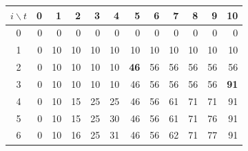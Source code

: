 \begin{tabular}{c|rrrrrrrrrrr}
\toprule
$i \backslash t$ & 0 & 1 & 2 & 3 & 4 & 5 & 6 & 7 & 8 & 9 & 10 \\
\midrule
0 & \cellcolor{green!25}0 & 0 & 0 & 0 & 0 & 0 & 0 & 0 & 0 & 0 & 0 \\
1 & \cellcolor{green!25}0 & 10 & 10 & 10 & 10 & 10 & 10 & 10 & 10 & 10 & 10 \\
2 & 0 & 10 & 10 & 10 & 10 & \cellcolor{green!25}\textbf{46} & 56 & 56 & 56 & 56 & 56 \\
3 & 0 & 10 & 10 & 10 & 10 & 46 & 56 & 56 & 56 & 56 & \cellcolor{green!25}\textbf{91} \\
4 & 0 & 10 & 15 & 25 & 25 & 46 & 56 & 61 & 71 & 71 & \cellcolor{green!25}91 \\
5 & 0 & 10 & 15 & 25 & 30 & 46 & 56 & 61 & 71 & 76 & \cellcolor{green!25}91 \\
6 & 0 & 10 & 16 & 25 & 31 & 46 & 56 & 62 & 71 & 77 & \cellcolor{green!25}91 \\
\bottomrule
\end{tabular}
